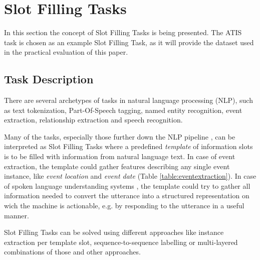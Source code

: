\documentclass[11pt,a4paper,twoside,openright]{scrbook}
\begin{document}
\chapter{Slot Filling Tasks}
In this section the concept of Slot Filling Tasks is being presented.
The ATIS task is chosen as an example Slot Filling Task, as it will provide the dataset used in the practical evaluation of this paper.

\section{Task Description}
There are several archetypes of tasks in natural language processing (NLP), such as  text tokenization, Part-Of-Speech tagging, named entity recognition, event extraction, relationship extraction and speech recognition.

Many of the tasks, especially those further down the NLP pipeline \cite{Fraser17}, can be interpreted as Slot Filling Tasks where a predefined \emph{template} of information slots is to be filled with information from natural language text. In case of event extraction, the template could gather features describing any single event instance, like \emph{event location} and \emph{event date} (Table \ref{table:eventextraction}). In case of spoken language understanding systems \cite{Mesnil15}, the template could try to gather all information needed to convert the utterance into a structured representation on wich the machine is actionable, e.g. by responding to the utterance in a useful manner.

Slot Filling Tasks can be solved using different approaches like instance extraction per template slot, sequence-to-sequence labelling or multi-layered combinations of those and other approaches.
\end{document}
